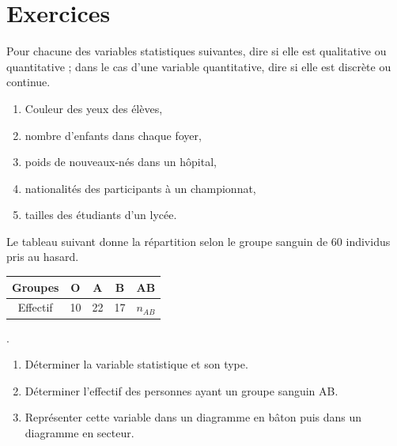 \section{Exercices}
      \begin{exo}
            \label{exo:stat1}
            Pour chacune des variables statistiques suivantes, dire si elle est qualitative ou quantitative ; 
            dans le cas d'une variable quantitative, dire si elle est discr\`ete ou continue.
            \begin{enumerate}
                  \item Couleur des yeux des \'el\`eves,
                  \item nombre d'enfants dans chaque foyer,
                  \item poids de nouveaux-n\'es dans un h\^opital,
                  \item nationalit\'es des participants \`a un championnat,
                  \item tailles des \'etudiants d'un lyc\'ee.
            \end{enumerate}
      \end{exo}
      \begin{exo}
            \label{exo:stat2}
            Le tableau suivant donne la répartition selon le groupe sanguin de 60 individus pris au hasard.
            \begin{table}[H]
                  \centering
                        \begin{tabular}[b]{|c|c|c|c|c|}
                        \hline 
                        Groupes & O & A & B & AB \\ 
                        \hline 
                        Effectif & 10 & 22 & 17 & $n_{AB}$ \\ 
                        \hline 
                  \end{tabular}. 
            \end{table}
            \begin{enumerate}
                  \item Déterminer la variable statistique et son type.
                  \item Déterminer l’effectif des personnes ayant un groupe sanguin AB.
                  \item Repr\'esenter cette variable dans un diagramme en b\^aton
                        puis dans un diagramme en secteur.
            \end{enumerate}
      \end{exo}
